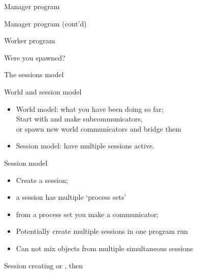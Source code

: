 \begin{numberedframe}{Manager program}
  \footnotesize
\end{numberedframe}

\begin{numberedframe}{Manager program (cont'd)}
  \footnotesize
\end{numberedframe}

\begin{numberedframe}{Worker program}
\end{numberedframe}

\begin{numberedframe}{Were you spawned?}
\end{numberedframe}

 {The sessions model}

\begin{numberedframe}{World and session model}
  \begin{itemize}
  \item World model: what you have been doing so far;\\
    Start with  and
    make subcommunicators, \\
    or spawn new world communicators and bridge them
  \item Session model: have multiple sessions active.
  \end{itemize}
\end{numberedframe}

\begin{numberedframe}{Session model}
  \begin{itemize}
  \item Create a session;
  \item a session has multiple `process sets'
  \item from a process set you make a communicator;
  \item Potentially create multiple sessions in one program run
  \item Can not mix objects from multiple simultaneous sessions
  \end{itemize}
\end{numberedframe}

\begin{numberedframe}{Session creating}
  or , then
\end{numberedframe}

